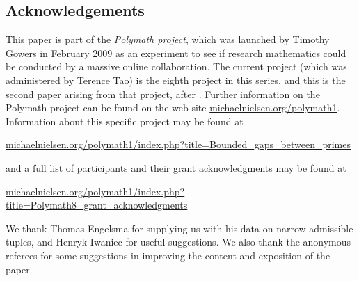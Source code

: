 \documentclass{bmcart}
\theoremstyle{plain}
\theoremstyle{definition}
\begin{document}
\begin{backmatter}



\section*{Acknowledgements}

This paper is part of the \emph{Polymath project}, which was launched
by Timothy Gowers in February 2009 as an experiment to see if research
mathematics could be conducted by a massive online collaboration.
The current project (which was administered by Terence Tao) is the eighth
project in this series, and this is the second paper arising from that project, after \cite{polymath8a}.  Further information on the Polymath project can be
found on the web site \url{michaelnielsen.org/polymath1}.  Information
about this specific project may be found at
\begin{center}
\small{\url{michaelnielsen.org/polymath1/index.php?title=Bounded\_gaps\_between\_primes}}
\end{center}
and a full list of participants and their grant acknowledgments may be
found at
\begin{center}
\small{\url{michaelnielsen.org/polymath1/index.php?title=Polymath8\_grant\_acknowledgments}}
\end{center}
\par
We thank Thomas Engelsma for supplying us with his data on narrow admissible tuples, and Henryk Iwaniec for useful suggestions.  We also thank the anonymous referees for some suggestions in improving the content and exposition of the paper.




\end{backmatter}
\end{document}
